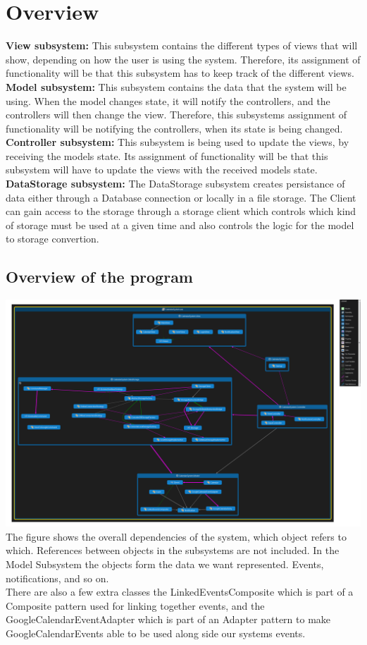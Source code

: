 \section{Overview}
\textbf{View subsystem:}
This subsystem contains the different types of views that will show, depending on how the user is 
using the system. Therefore, its assignment of functionality will be that this subsystem 
has to keep track of the different views.\\
\textbf{Model subsystem:}
This subsystem contains the data that the system will be using. When the model changes state, 
it will notify the controllers, and the controllers will then change the view. Therefore, 
this subsystems assignment of functionality will be notifying the controllers, 
when its state is being changed.\\
\textbf{Controller subsystem:}
This subsystem is being used to update the views, by receiving the models state. 
Its assignment of functionality will be that this subsystem will have to update the views 
with the received models state.\\
\textbf{DataStorage subsystem:}
The DataStorage subsystem creates persistance of data either through a Database connection or locally in a file storage. The Client can gain access to the storage through a storage client which controls which kind of storage must be used at a given time and also controls the logic for the model to storage convertion. 

\subsection{Overview of the program}
\includegraphics[scale=0.2]{OverallClassDependencies}
The figure shows the overall dependencies of the system, which object refers to which. References between objects in the subsystems are not included. In the Model Subsystem the objects form the data we want represented. Events, notifications, and so on. \\There are also a few extra classes the LinkedEventsComposite which is part of a Composite pattern used for linking together events, and the GoogleCalendarEventAdapter which is part of an Adapter pattern to make GoogleCalendarEvents able to be used along side our systems events.

